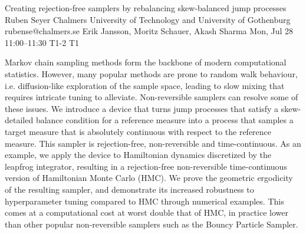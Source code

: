 \documentclass[12pt,lettersize,oneside]{book} %
\begin{document}
\begin{talk}
  {Creating rejection-free samplers by rebalancing skew-balanced jump processes}%
  {Ruben Seyer}%
  {Chalmers University of Technology and University of Gothenburg}%
  {rubense@chalmers.se}%
  {Erik Jansson, Moritz Schauer, Akash Sharma}%
  {}%
  {Mon, Jul 28 11:00--11:30}%
  {T1-2}%
  {T1}%
  
    
   
Markov chain sampling methods form the backbone of modern computational statistics.
However, many popular methods are prone to random walk behaviour, i.e.\@{} diffusion-like exploration of the sample space, leading to slow mixing that requires intricate tuning to alleviate.
Non-reversible samplers can resolve some of these issues.
We introduce a device that turns jump processes that satisfy a skew-detailed balance condition for a reference measure into a process that samples a target measure that is absolutely continuous with respect to the reference measure.
This sampler is rejection-free, non-reversible and time-continuous.
As an example, we apply the device to Hamiltonian dynamics discretized by the leapfrog integrator, resulting in a rejection-free non-reversible time-continuous version of Hamiltonian Monte Carlo (HMC).
We prove the geometric ergodicity of the resulting sampler, and demonstrate its increased robustness to hyperparameter tuning compared to HMC through numerical examples.
This comes at a computational cost at worst double that of HMC, in practice lower than other popular non-reversible samplers such as the Bouncy Particle Sampler.
\end{talk}
\end{document}
